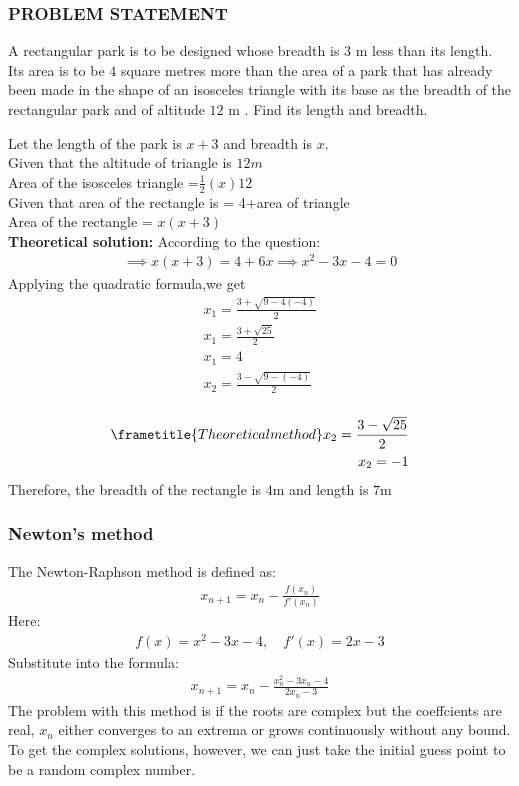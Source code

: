\documentclass{beamer}
\providecommand{\brak}[1]{\ensuremath{\left(#1\right)}}
\theoremstyle{remark}
\numberwithin{equation}{section}
\begin{document}
\begin{frame}
   \frametitle{PROBLEM STATEMENT}
A rectangular park is to be designed whose breadth is $3$ m less than its length. Its area is to be $4$ square metres more than the area of a park that has already been made in the shape of an isosceles triangle with its base as the breadth of the rectangular park and of altitude $12$ m . Find its length and breadth.\\
\end{frame}
\begin{frame}
 Let the length of the park is $x+3$ and breadth is $x$.\\
Given that the altitude of triangle is $12m$\\ 
Area of the isosceles triangle =$\frac{1}{2}\brak{x}12$\\
Given that area of the rectangle is = 4+area of triangle\\
Area of the rectangle = $x\brak{x+3}$\\
\textbf{Theoretical solution:}
According to the question:\\
\begin{align}
    \implies x\brak{x+3}=4+6x
    \implies x^2-3x-4=0
\end{align}
Applying the quadratic formula,we get
\begin{align}
    x_1=\frac{3+\sqrt{9-4\brak{-4}}}{2}\\
    x_1=\frac{3+\sqrt{25}}{2}\\
    x_1=4\\
    x_2=\frac{3-\sqrt{9-\brak{-4}}}{2}\\
\end{align}
\end{frame}
\begin{frame}
\begin{align}
\frametitle{Theoretical method}
 x_2=\frac{3-\sqrt{25}}{2}\\
    x_2=-1
\end{align}
Therefore, the breadth of the rectangle is $4$m and length is $7$m\\
    
\end{frame}
\begin{frame}
\frametitle{Newton's method}
The Newton-Raphson method is defined as:
\begin{align}
    x_{n+1} = x_n - \frac{f(x_n)}{f'(x_n)}
\end{align}
Here:
\begin{align}
    f(x) = x^2 - 3x - 4, \quad f'(x) = 2x - 3
\end{align}
Substitute into the formula:
\begin{align}
    x_{n+1} = x_n - \frac{x_n^2 - 3x_n - 4}{2x_n - 3}
\end{align}
The problem with this method is if the roots are complex but the coeffcients are real, $x_n$ either converges to an extrema or grows continuously without any bound.
	To get the complex solutions, however, we can just take the initial guess point to be a 
	random complex number.\\
\end{frame}
\end{document}
